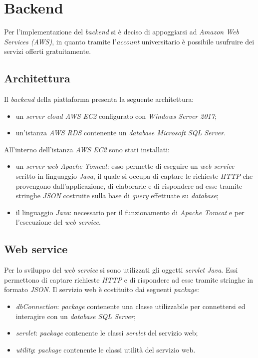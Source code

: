 \documentclass[12pt, a4paper, titlepage]{report}
\begin{document}
	\section{Backend}
	
	Per l'implementazione del \textit{backend} si è deciso di appoggiarsi ad \textit{Amazon Web Services (AWS)}, in quanto tramite l'\textit{account} universitario è possibile usufruire dei servizi offerti gratuitamente.
	
	\subsection{Architettura}
	
	Il \textit{backend} della piattaforma presenta la seguente architettura:
	\begin{itemize}
		\item un \textit{server cloud AWS EC2} configurato con \textit{Windows Server 2017};
		\item un'istanza \textit{AWS RDS} contenente un \textit{database Microsoft SQL Server}.
	\end{itemize}
	All'interno dell'istanza \textit{AWS EC2} sono stati installati:
	\begin{itemize}
		\item un \textit{server web Apache Tomcat}: esso permette di eseguire un \textit{web service} scritto in linguaggio \textit{Java}, il quale si occupa di captare le richieste \textit{HTTP} che provengono dall'applicazione, di elaborarle e di rispondere ad esse tramite stringhe \textit{JSON} costruite sulla base di \textit{query} effettuate su \textit{database};
		\item il linguaggio \textit{Java}: necessario per il funzionamento di \textit{Apache Tomcat} e per l'esecuzione del \textit{web service}.
	\end{itemize}

	\subsection{Web service}
	
	Per lo sviluppo del \textit{web service} si sono utilizzati gli oggetti \textit{servlet Java}. Essi permettono di captare richieste \textit{HTTP} e di rispondere ad esse tramite stringhe in formato \textit{JSON}. Il servizio web è costituito dai seguenti \textit{package}:
	\begin{itemize}
		\item \textit{dbConnection}: \textit{package} contenente una classe utilizzabile per connettersi ed interagire con un \textit{database SQL Server};
		\item \textit{servlet}: \textit{package} contenente le classi \textit{servlet} del servizio web;
		\item \textit{utility}: \textit{package} contenente le classi utilità del servizio web.
	\end{itemize}
\end{document}
